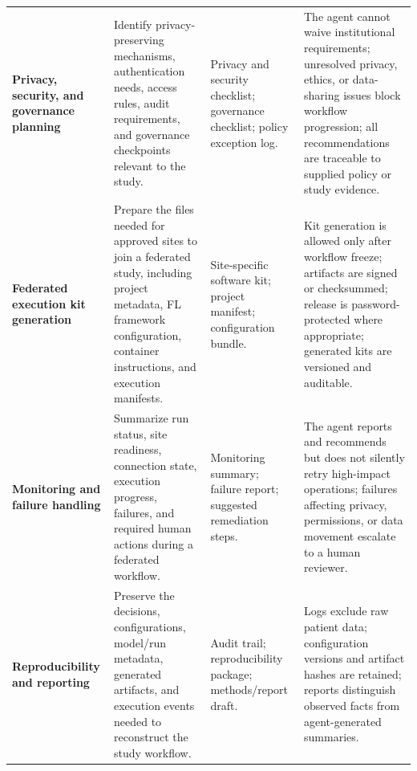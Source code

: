 \documentclass[preprint,5p, 10pt, times]{elsarticle}
\begin{document}
\begin{table}[t]
\begin{tabularx}{\textwidth}{
>{\raggedright\arraybackslash}p{2.8cm}
>{\raggedright\arraybackslash}X
>{\raggedright\arraybackslash}X
>{\raggedright\arraybackslash}X}
\textbf{Privacy, security, and governance planning}
& Identify privacy-preserving mechanisms, authentication needs, access rules, audit requirements, and governance checkpoints relevant to the study.
& Privacy and security checklist; governance checklist; policy exception log.
& The agent cannot waive institutional requirements; unresolved privacy, ethics, or data-sharing issues block workflow progression; all recommendations are traceable to supplied policy or study evidence. \\
\addlinespace[3pt]

\textbf{Federated execution kit generation}
& Prepare the files needed for approved sites to join a federated study, including project metadata, FL framework configuration, container instructions, and execution manifests.
& Site-specific software kit; project manifest; configuration bundle.
& Kit generation is allowed only after workflow freeze; artifacts are signed or checksummed; release is password-protected where appropriate; generated kits are versioned and auditable. \\
\addlinespace[3pt]

\textbf{Monitoring and failure handling}
& Summarize run status, site readiness, connection state, execution progress, failures, and required human actions during a federated workflow.
& Monitoring summary; failure report; suggested remediation steps.
& The agent reports and recommends but does not silently retry high-impact operations; failures affecting privacy, permissions, or data movement escalate to a human reviewer. \\
\addlinespace[3pt]

\textbf{Reproducibility and reporting}
& Preserve the decisions, configurations, model/run metadata, generated artifacts, and execution events needed to reconstruct the study workflow.
& Audit trail; reproducibility package; methods/report draft.
& Logs exclude raw patient data; configuration versions and artifact hashes are retained; reports distinguish observed facts from agent-generated summaries. \\
\bottomrule
\end{tabularx}
\end{table}
\end{document}
